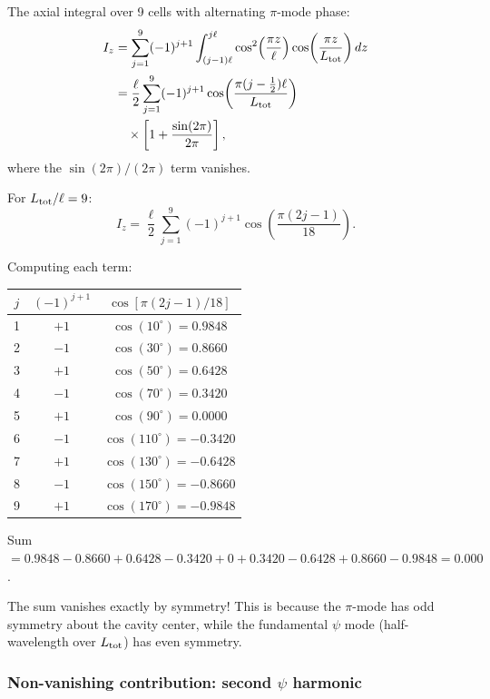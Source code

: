 \documentclass[12pt,aps,prd,twocolumn,superscriptaddress,nofootinbib]{revtex4-2}
\newcommand{\half}{\tfrac{1}{2}}
\begin{document}
The axial integral over 9 cells with alternating $\pi$-mode phase:
\begin{align}
I_z &= \sum_{j=1}^{9} (-1)^{j+1}\int_{(j-1)\ell}^{j\ell}
\cos^2\!\left(\frac{\pi z}{\ell}\right)
\cos\!\left(\frac{\pi z}{L_{\rm tot}}\right)dz
\nonumber\\
&= \frac{\ell}{2}\sum_{j=1}^{9}(-1)^{j+1}
\cos\!\left(\frac{\pi(j-\half)\ell}{L_{\rm tot}}\right)
\nonumber\\
&\quad\times\left[1 + \frac{\sin(2\pi)}
{2\pi}\right],
\label{eq:I_z}
\end{align}
where the $\sin(2\pi)/(2\pi)$ term vanishes.

For $L_{\rm tot}/\ell = 9$:
\begin{equation}
I_z = \frac{\ell}{2}\sum_{j=1}^{9}(-1)^{j+1}
\cos\!\left(\frac{\pi(2j-1)}{18}\right).
\label{eq:I_z_sum}
\end{equation}

Computing each term:
\begin{center}
\begin{tabular}{ccc}
\toprule
$j$ & $(-1)^{j+1}$ & $\cos[\pi(2j-1)/18]$ \\
\midrule
1 & $+1$ & $\cos(10^\circ) = 0.9848$ \\
2 & $-1$ & $\cos(30^\circ) = 0.8660$ \\
3 & $+1$ & $\cos(50^\circ) = 0.6428$ \\
4 & $-1$ & $\cos(70^\circ) = 0.3420$ \\
5 & $+1$ & $\cos(90^\circ) = 0.0000$ \\
6 & $-1$ & $\cos(110^\circ) = -0.3420$ \\
7 & $+1$ & $\cos(130^\circ) = -0.6428$ \\
8 & $-1$ & $\cos(150^\circ) = -0.8660$ \\
9 & $+1$ & $\cos(170^\circ) = -0.9848$ \\
\bottomrule
\end{tabular}
\end{center}

Sum $= 0.9848 - 0.8660 + 0.6428 - 0.3420 + 0 + 0.3420
- 0.6428 + 0.8660 - 0.9848 = 0.000$.

The sum vanishes exactly by symmetry!  This is because the $\pi$-mode
has odd symmetry about the cavity center, while the fundamental
$\psi$ mode (half-wavelength over $L_{\rm tot}$) has even symmetry.

\subsubsection{Non-vanishing contribution: second $\psi$ harmonic}
\end{document}
